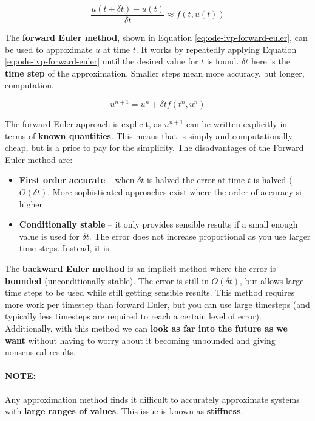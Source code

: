\documentclass{article}
\begin{document}
\begin{equation}
	\frac{u(t + \delta t) - u(t)}{\delta t} \approx f(t, u(t))
	\label{eq:ode-ivp-approx}
\end{equation}

The \textbf{forward Euler method}, shown in Equation \ref{eq:ode-ivp-forward-euler}, can be used to approximate $u$ at time $t$. It works by repeatedly applying Equation \ref{eq:ode-ivp-forward-euler} until the desired value for $t$ is found. $\delta t$ here is the \textbf{time step} of the approximation. Smaller steps mean more accuracy, but longer, computation.

\begin{equation}
	u^{n + 1} = u^n + \delta t f(t^n, u^n)
		\label{eq:ode-ivp-forward-euler}
\end{equation}

The forward Euler approach is explicit, as $u^{n+1}$ can be written explicitly in terms of \textbf{known quantities}. This means that is simply and computationally cheap, but is a price to pay for the simplicity. The disadvantages of the Forward Euler method are:
\begin{itemize}
	\item \textbf{First order accurate} -- when $\delta t$ is halved the error at time $t$ is halved ($O(\delta t)$. More sophisticated approaches exist where the order of accuracy si higher
	\item \textbf{Conditionally stable} -- it only provides sensible results if a small enough value is used for $\delta t$. The error does not increase proportional as you use larger time steps. Instead, it is 
\end{itemize}

The \textbf{backward Euler method} is an implicit method where the error is \textbf{bounded} (unconditionally stable). The error is still in $O(\delta t)$, but allows large time steps to be used while still getting sensible results. This method requires more work per timestep than forward Euler, but you can use large timesteps (and typically less timesteps are required to reach a certain level of error). Additionally, with this method we can \textbf{look as far into the future as we want} without having to worry about it becoming unbounded and giving nonsensical results.

\paragraph{\textbf{NOTE: }} Any approximation method finds it difficult to accurately approximate systems with \textbf{large ranges of values}. This issue is known as \textbf{stiffness}.
\end{document}
